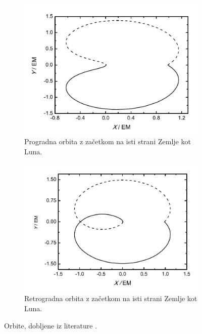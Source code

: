 \documentclass[11pt, titlepage]{article}
\begin{document}
\begin{figure}[h]
    \vspace{0.5cm}

    \begin{subfigure}[b]{0.45\textwidth}
        \centering
        \includegraphics[width=\textwidth]{figures/theory_orbit_3.png}
        \caption{Progradna orbita z začetkom na isti strani Zemlje kot Luna.}
        \label{fig:orbit_3}
    \end{subfigure}
    \hfill
    \begin{subfigure}[b]{0.45\textwidth}
        \centering
        \includegraphics[width=\textwidth]{figures/theory_orbit_4.png}
        \caption{Retrogradna orbita z začetkom na isti strani Zemlje kot Luna.}
        \label{fig:orbit_4}
    \end{subfigure}

    \caption{Orbite, dobljene iz literature \cite{XIYUN2013183}.}
    \label{fig:theory_orbits}
\end{figure}
\end{document}
